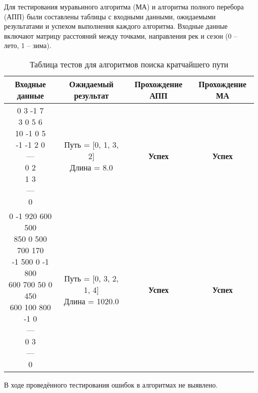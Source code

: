 \hspace{1.25cm}
Для тестирования муравьиного алгоритма (МА) и алгоритма полного перебора (АПП) были составлены таблицы с входными данными, ожидаемыми результатами и успехом выполнения каждого алгоритма. Входные данные включают матрицу расстояний между точками, направления рек и сезон (0 -- лето, 1 -- зима).

\vspace{0.25cm}
\begin{table}[H]
    \centering
    \caption{Таблица тестов для алгоритмов поиска кратчайшего пути}
    \renewcommand{\arraystretch}{1.5} %
    \begin{tabular}{|c|c|c|c|}
        \hline
        \textbf{Входные данные} & \textbf{Ожидаемый результат} & \textbf{Прохождение АПП} & \textbf{Прохождение МА} \\
        \hline
        \makecell{0 3 -1 7 \\ 3 0 5 6 \\ 10 -1 0 5 \\ -1 -1 2 0 \\ --- \\ 0 2 \\ 1 3 \\ --- \\ 0} & \makecell{Путь = [0, 1, 3, 2] \\ Длина = 8.0} & \textbf{Успех} & \textbf{Успех} \\
        \hline
        \makecell{0 -1 920 600 500 \\ 850 0 500 700 170 \\ -1 500 0 -1 800 \\ 600 700 50 0 450 \\ 600 100 800 -1 0 \\ --- \\ 0 3 \\ --- \\ 0} & \makecell{Путь = [0, 3, 2, 1, 4] \\ Длина = 1020.0} & \textbf{Успех} & \textbf{Успех} \\
        \hline
    \end{tabular}
\end{table}

В ходе проведённого тестирования ошибок в алгоритмах не выявлено.

\newpage